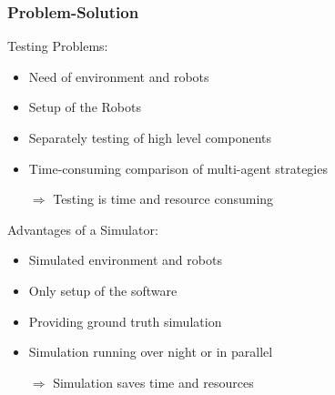 \documentclass{beamer}
\begin{document}
\begin{frame}
\frametitle{Problem-Solution}
\begin{multicols}{2}
Testing Problems:
\begin{itemize}
\item Need of environment and robots
\item Setup of the Robots %
\item Separately testing of high level components
\item Time-consuming comparison of multi-agent strategies 
\item[$\Rightarrow$] Testing is time and resource consuming
\end{itemize}
Advantages of a Simulator:
\begin{itemize}
\item Simulated environment and robots
\item Only setup of the software
\item Providing ground truth simulation
\item Simulation running over night or in parallel
\item[$\Rightarrow$] Simulation saves time and resources
\end{itemize}
\end{multicols}
\end{frame}
\end{document}
